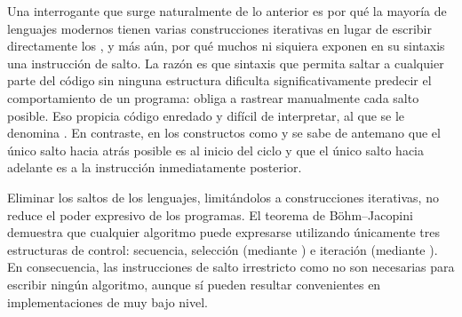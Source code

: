 Una interrogante que surge naturalmente de lo anterior es por qué la mayoría de lenguajes modernos tienen varias construcciones iterativas en lugar de escribir directamente los , y más aún, por qué muchos ni siquiera exponen en su sintaxis una instrucción de salto. La razón es que sintaxis que permita saltar a cualquier parte del código sin ninguna estructura dificulta significativamente predecir el comportamiento de un programa: obliga a rastrear manualmente cada salto posible. Eso propicia código enredado y difícil de interpretar, al que se le denomina . En contraste, en los constructos como  y  se sabe de antemano que el único salto hacia atrás posible es al inicio del ciclo y que el único salto hacia adelante es a la instrucción inmediatamente posterior.

Eliminar los saltos de los lenguajes, limitándolos a construcciones iterativas, no reduce el poder expresivo de los programas. El teorema de Böhm–Jacopini demuestra que cualquier algoritmo puede expresarse utilizando únicamente tres estructuras de control: secuencia, selección (mediante ) e iteración (mediante ). En consecuencia, las instrucciones de salto irrestricto como  no son necesarias para escribir ningún algoritmo, aunque sí pueden resultar convenientes en implementaciones de muy bajo nivel.